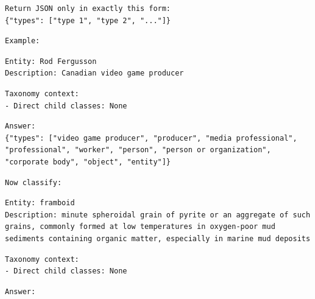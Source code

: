 \begin{Verbatim}[fontsize=\footnotesize,breaklines=true,breakanywhere=true]
Return JSON only in exactly this form:
{"types": ["type 1", "type 2", "..."]}
\end{Verbatim}

\begin{Verbatim}[fontsize=\footnotesize,breaklines=true,breakanywhere=true]
Example:
\end{Verbatim}

\begin{Verbatim}[fontsize=\footnotesize,breaklines=true,breakanywhere=true]
Entity: Rod Fergusson
Description: Canadian video game producer
\end{Verbatim}

\begin{Verbatim}[fontsize=\footnotesize,breaklines=true,breakanywhere=true]
Taxonomy context:
- Direct child classes: None
\end{Verbatim}

\begin{Verbatim}[fontsize=\footnotesize,breaklines=true,breakanywhere=true]
Answer:
{"types": ["video game producer", "producer", "media professional", "professional", "worker", "person", "person or organization", "corporate body", "object", "entity"]}
\end{Verbatim}

\begin{Verbatim}[fontsize=\footnotesize,breaklines=true,breakanywhere=true]
Now classify:
\end{Verbatim}

\begin{Verbatim}[fontsize=\footnotesize,breaklines=true,breakanywhere=true]
Entity: framboid
Description: minute spheroidal grain of pyrite or an aggregate of such grains, commonly formed at low temperatures in oxygen-poor mud sediments containing organic matter, especially in marine mud deposits
\end{Verbatim}

\begin{Verbatim}[fontsize=\footnotesize,breaklines=true,breakanywhere=true]
Taxonomy context:
- Direct child classes: None
\end{Verbatim}

\begin{Verbatim}[fontsize=\footnotesize,breaklines=true,breakanywhere=true]
Answer:
\end{Verbatim}
